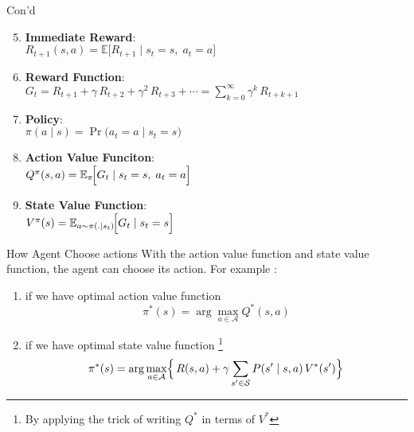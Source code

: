\documentclass{beamer}
\begin{document}
    \begin{frame}{Con'd}
        \begin{enumerate}
            \setcounter{enumi}{4}
            \item \textbf{Immediate Reward}: \\
            $R_{t+1}(s, a) = \mathbb{E}\bigl[R_{t+1} \mid s_t=s,\;a_t=a\bigr]$
            \item \textbf{Reward Function}: \\
            $G_t
            = R_{t+1} + \gamma\,R_{t+2} + \gamma^2\,R_{t+3} + \cdots
            = \sum_{k=0}^{\infty}\gamma^k\,R_{t+k+1}$

            \item \textbf{Policy}: \\
            $\pi(a \mid s)
            = \Pr\bigl(a_t=a \mid s_t=s\bigr)$

            \item \textbf{Action Value Funciton}: \\
            $Q^{\pi}(s,a)= \mathbb{E}_{\pi}\!\Bigl[G_t \mid s_t = s,\;a_t=a\Bigr]$


            \item \textbf{State Value Function}: \\
            $V^{\pi}(s)= \mathbb{E}_{a\sim\pi(.|s_t)}\!\Bigl[G_t \mid s_t = s\Bigr]$
            
        \end{enumerate}

    \end{frame}

    \begin{frame}{How Agent Choose actions}
        With the action value function and state value function, the agent can choose its action. For example : 
        \begin{enumerate}
            \item if we have optimal action value function\[
            \pi^*(s) = \arg\max_{a \in \mathcal{A}} Q^*(s, a)
            \]
            \item if we have optimal state value function \footnote{By applying the trick of writing $Q^*$ in terms of $V^*$}
            \[
            \pi^*(s) = \arg\max_{a \in \mathcal{A}}
            \Bigl\{\,R(s, a) + \gamma \sum_{s' \in \mathcal{S}} P(s' \mid s, a)\,V^*(s')\Bigr\}
            \]
        \end{enumerate}
    \end{frame}
\end{document}

